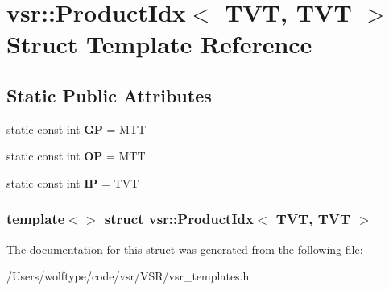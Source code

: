 \hypertarget{structvsr_1_1_product_idx_3_01_t_v_t_00_01_t_v_t_01_4}{\section{vsr\-:\-:Product\-Idx$<$ T\-V\-T, T\-V\-T $>$ Struct Template Reference}
\label{structvsr_1_1_product_idx_3_01_t_v_t_00_01_t_v_t_01_4}
}
\subsection*{Static Public Attributes}
\begin{DoxyCompactItemize}
\item 
\hypertarget{structvsr_1_1_product_idx_3_01_t_v_t_00_01_t_v_t_01_4_ac232cd4d0573475be23fa8f6c763905d}{static const int {\bfseries G\-P} = M\-T\-T}\label{structvsr_1_1_product_idx_3_01_t_v_t_00_01_t_v_t_01_4_ac232cd4d0573475be23fa8f6c763905d}

\item 
\hypertarget{structvsr_1_1_product_idx_3_01_t_v_t_00_01_t_v_t_01_4_a57f025ca2fe2f70a80ebd683d562e456}{static const int {\bfseries O\-P} = M\-T\-T}\label{structvsr_1_1_product_idx_3_01_t_v_t_00_01_t_v_t_01_4_a57f025ca2fe2f70a80ebd683d562e456}

\item 
\hypertarget{structvsr_1_1_product_idx_3_01_t_v_t_00_01_t_v_t_01_4_aa4716f941fc1aa40bfbf5cd5dfe08040}{static const int {\bfseries I\-P} = T\-V\-T}\label{structvsr_1_1_product_idx_3_01_t_v_t_00_01_t_v_t_01_4_aa4716f941fc1aa40bfbf5cd5dfe08040}

\end{DoxyCompactItemize}
\subsubsection*{template$<$$>$ struct vsr\-::\-Product\-Idx$<$ T\-V\-T, T\-V\-T $>$}



The documentation for this struct was generated from the following file\-:\begin{DoxyCompactItemize}
\item 
/\-Users/wolftype/code/vsr/\-V\-S\-R/vsr\-\_\-templates.\-h\end{DoxyCompactItemize}
